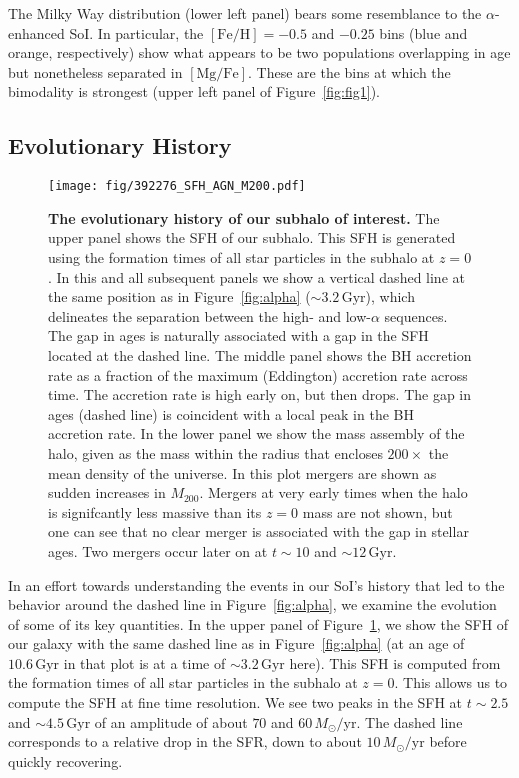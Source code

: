 \documentclass[linenumbers, twocolumn]{aastex631}
\newcommand{\Msun}{\ensuremath{M_{\odot}}}
\newcommand{\Gyr}{\ensuremath{\textrm{Gyr}}}
\newcommand{\FeH}{\ensuremath{[\textrm{Fe}/\textrm{H}]}}
\newcommand{\MgFe}{\ensuremath{[\textrm{Mg}/\textrm{Fe}]}}
\newcommand{\Msunyr}{\ensuremath{\Msun/\textrm{yr}}}
\begin{document}
The Milky Way distribution (lower left panel) bears some resemblance to the $\alpha$-enhanced SoI. In particular, the $\FeH=-0.5$ and $-0.25$ bins (blue and orange, respectively) show what appears to be two populations overlapping in age but nonetheless separated in \MgFe{}. These are the bins at which the bimodality is strongest (upper left panel of Figure~\ref{fig:fig1}).

\subsection{Evolutionary History}\label{ssec:evol}

\begin{figure}
  \centering
  \texttt{[image: fig/392276\_SFH\_AGN\_M200.pdf]}
  \caption{\textbf{The evolutionary history of our subhalo of interest.} The upper panel shows the SFH of our subhalo. This SFH is generated using the formation times of all star particles in the subhalo at $z=0$. In this and all subsequent panels we show a vertical dashed line at the same position as in Figure~\ref{fig:alpha} ($\sim3.2\,\Gyr$), which delineates the separation between the high- and low-$\alpha$ sequences. The gap in ages is naturally associated with a gap in the SFH located at the dashed line. The middle panel shows the BH accretion rate as a fraction of the maximum (Eddington) accretion rate across time. The accretion rate is high early on, but then drops. The gap in ages (dashed line) is coincident with a local peak in the BH accretion rate. In the lower panel we show the mass assembly of the halo, given as the mass within the radius that encloses $200\times$ the mean density of the universe. In this plot mergers are shown as sudden increases in $M_{200}$. Mergers at very early times when the halo is signifcantly less massive than its $z=0$ mass are not shown, but one can see that no clear merger is associated with the gap in stellar ages. Two mergers occur later on at $t\sim10$ and $\sim12\,\Gyr$.}
  \label{fig:history}
\end{figure}

In an effort towards understanding the events in our SoI's history that led to the behavior around the dashed line in Figure~\ref{fig:alpha}, we examine the evolution of some of its key quantities. In the upper panel of Figure~\ref{fig:history}, we show the SFH of our galaxy with the same dashed line as in Figure~\ref{fig:alpha} (at an age of $10.6\,\Gyr$ in that plot is at a time of $\sim3.2\,\Gyr$ here). This SFH is computed from the formation times of all star particles in the subhalo at $z=0$. This allows us to compute the SFH at fine time resolution. We see two peaks in the SFH at $t\sim2.5$ and $\sim4.5\,\Gyr$ of an amplitude of about $70$ and $60\,\Msunyr$. The dashed line corresponds to a relative drop in the SFR, down to about $10\,\Msunyr$ before quickly recovering.
\end{document}
